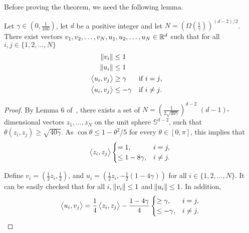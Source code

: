 Before proving the theorem, we need the following lemma.

\begin{lemma}
\label{lemma:embed_d_gamma}
Let $\gamma \in (0,\frac 1 {160})$, let $d$ be a positive integer and let $N = (\Omega(\frac{1}{\gamma}))^{(d-2)/2}$.
There exist vectors $v_1, v_2, \dots, v_N, u_1, u_2, \dots, u_N \in \mathbb{R}^d$ such that for all $i, j \in \{1,2,\dots,N\}$
\begin{align*}
\norm{v_i} & \le 1 \, \\
\norm{u_i} & \le 1 \, \\
\left\langle u_i, v_j \right\rangle & \ge \gamma & & \text{if $i=j$,} \\
\left\langle u_i, v_j \right\rangle & \le -\gamma & & \text{if $i \neq j$.}
\end{align*}
\end{lemma}

\begin{proof}
By Lemma 6 of~\cite{Long-1995}, there exists a set of $N =
(\frac{1}{2\sqrt{40\gamma}})^{d-2}$ $(d-1)$-dimensional vectors $z_1, \ldots,
z_N$ on the unit sphere $\mathbb{S}^{d-2}$, such that $\theta(z_i, z_j) \ge
\sqrt{40 \gamma}$. As $\cos\theta \le 1-\theta^2/5$ for every $\theta \in
[0,\pi]$, this implies that
$$
\left\langle z_i, z_j \right\rangle \begin{cases} = 1 ,& i = j, \\ \le 1- 8\gamma ,& i \neq j. \end{cases}
$$

Define $v_i = (\frac12 z_i, \frac12)$, and $u_i = (\frac{1}{2} z_i, -\frac{1}{2}(1-4\gamma))$ for all $i \in \{1,2,\dots,N\}$.
It can be easily checked that for all $i$,
$\norm{v_i} \le 1$ and $\norm{u_i} \le 1$. In addition,
$$
\left\langle u_i, v_j \right\rangle
= \frac{1}{4} \left\langle z_i, z_j \right\rangle - \frac {1-4\gamma} 4 \begin{cases} \ge \gamma ,& i = j, \\ \le -\gamma ,& i \neq j. \end{cases}
$$
\end{proof}

